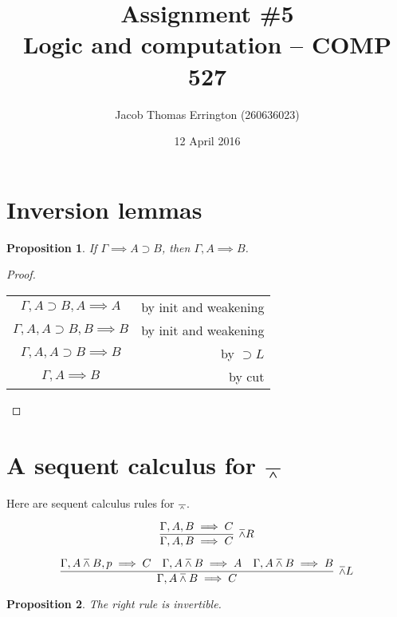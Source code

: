 \documentclass[letterpaper,11pt]{article}
\author{Jacob Thomas Errington (260636023)}
\title{Assignment \#5\\Logic and computation -- COMP 527}
\date{12 April 2016}
\newtheorem{prop}{Proposition}
\newcommand{\seq}{\implies}
\newcommand{\imp}{\supset}
\newcommand{\nand}{\barwedge}
\begin{document}
\maketitle

\section{Inversion lemmas}

\begin{prop}
    If $\Gamma \seq A \imp B$, then $\Gamma, A \seq B$.
\end{prop}

\begin{proof} ~


    \begin{center}
        \begin{tabular}{c r}
            $\Gamma, A \imp B, A \seq A$
            &
            by init and weakening \\
            $\Gamma, A, A \imp B, B \seq B$
            &
            by init and weakening \\
            $\Gamma, A, A \imp B \seq B$
            &
            by $\imp L$ \\
            $\Gamma, A \seq B$
            &
            by cut
        \end{tabular}
    \end{center}
\end{proof}

\section{A sequent calculus for $\nand$}

Here are sequent calculus rules for $\nand$.

\begin{equation*}
    \infer[\nand R]{\Gamma, A, B \seq C}{
        \Gamma, A, B \seq C
    }
\end{equation*}

\begin{equation*}
    \infer[\nand L]{\Gamma, A \nand B \seq C}{
        \Gamma, A \nand B, p \seq C
        &
        \Gamma, A \nand B \seq A
        &
        \Gamma, A \nand B \seq B
    }
\end{equation*}

\begin{prop}
    The right rule is invertible.
\end{prop}
\end{document}
